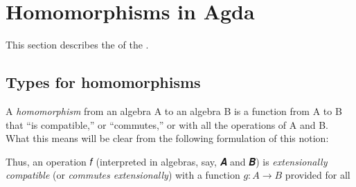 \documentclass[a4paper,USenglish,cleveref,autoref,thm-restate]{lipics-v2019}
\begin{document}
\section{Homomorphisms in Agda}\label{sec:homs-in-agda}
This section describes the \homsmodule of the \agdaualib.

\subsection{Types for homomorphisms}\label{sec:types-for-homomorphisms}
A \emph{homomorphism} from an algebra \alg A to an algebra \alg B is a function from \m A to \m B that ``is compatible,'' or ``commutes,'' or  with all the operations of \alg A and \alg B. What this means will be clear from the following \agda formulation of this notion:
\begin{code}\end{code}
Thus, an operation 𝑓 (interpreted in algebras, say, 𝑨 and 𝑩) is \emph{extensionally compatible} (or \emph{commutes extensionally}) with a function \(g : A → B\) provided for all
\AgdaSpace{}%
\AgdaSymbol{:}\AgdaSpace{}%
\AgdaSpace{}%
\AgdaSpace{}%
\AgdaSpace{}%
\AgdaSpace{}%
\AgdaSpace{}%
\end{document}
